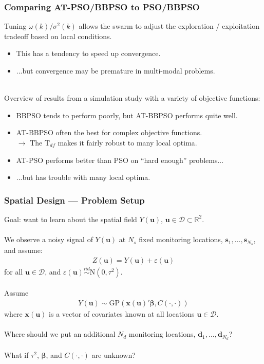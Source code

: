 \documentclass[xcolor=dvipsnames]{beamer}
\begin{document}
\begin{frame}
\frametitle{Comparing AT-PSO/BBPSO to PSO/BBPSO}
Tuning $\omega(k)/\sigma^2(k)$ allows the swarm to adjust the exploration / exploitation tradeoff based on local conditions.
\begin{itemize}
\item This has a tendency to speed up convergence.
\item ...but convergence may be premature in multi-modal problems.\\~\\
\end{itemize}

\pause

Overview of results from a simulation study with a variety of objective functions:
\begin{itemize}
\item BBPSO tends to perform poorly, but AT-BBPSO performs quite well.\\
\item AT-BBPSO often the best for complex objective functions.\\
$\to$ The $\mathrm{T}_{df}$ makes it fairly robust to many local optima.\pause 
\item AT-PSO performs better than PSO on ``hard enough'' problems... \pause
\item ...but has trouble with many local optima.
\end{itemize}
\end{frame}

\begin{frame}
\frametitle{Spatial Design --- Problem Setup}
Goal: want to learn about the spatial field $Y(\bm{u})$, $\bm{u}\in\mathcal{D}\subset \mathbb{R}^2$. \pause\\~\\

We observe a noisy signal of $Y(\bm{u})$ at $N_s$ fixed monitoring locations, $\bm{s}_1, \dots, \bm{s}_{N_s}$, 
and assume:
\begin{align*}
Z(\bm{u}) = Y(\bm{u}) + \varepsilon(\bm{u})
\end{align*}
for all $\bm{u}\in\mathcal{D}$, and $\varepsilon(\bm{u}) \stackrel{iid}{\sim} \mathrm{N}(0, \tau^2)$. \pause\\~\\

Assume 
\begin{align*}
Y(\bm{u}) \sim \mathrm{GP}(\bm{x}(\bm{u})'\bm{\beta}, C(\cdot, \cdot))
\end{align*}
where $\bm{x}(\bm{u})$ is a vector of covariates known at all locations $\bm{u}\in\mathcal{D}$. \pause \\~\\

Where should we put an additional $N_d$ monitoring locations, $\bm{d}_1, \dots, \bm{d}_{N_d}$? \pause \\~\\

What if $\tau^2$, $\bm{\beta}$, and $C(\cdot, \cdot)$ are unknown?
\end{frame}
\end{document}

